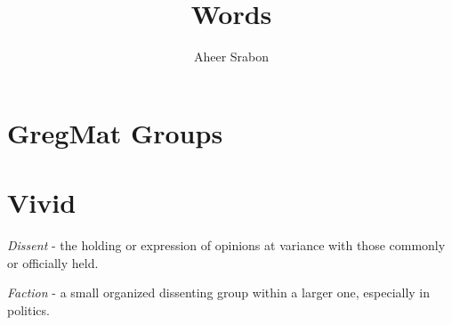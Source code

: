 

\title{Words}
\author{Aheer Srabon}
\date{}


\maketitle

\section{GregMat Groups}

\section{Vivid}

\emph{Dissent} - the holding or expression of opinions at variance with those commonly
or officially held.

\emph{Faction} - a small organized dissenting group within a larger one, especially in politics.


